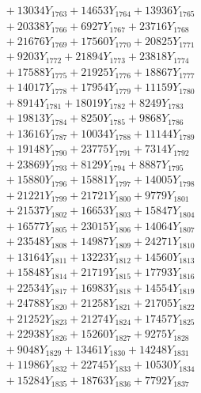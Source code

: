 \documentclass[a4paper,10pt]{article}
\begin{document}
{\begin{align}
&\;  + 13034 Y_{1763} + 14653 Y_{1764} + 13936 Y_{1765} \\[0.3ex]
&\;  + 20338 Y_{1766} + 6927 Y_{1767} + 23716 Y_{1768} \\[0.5ex]\allowbreak
&\;  + 21676 Y_{1769} + 17560 Y_{1770} + 20825 Y_{1771} \\[0.3ex]
&\;  + 9203 Y_{1772} + 21894 Y_{1773} + 23818 Y_{1774} \\[0.3ex]
&\;  + 17588 Y_{1775} + 21925 Y_{1776} + 18867 Y_{1777} \\[0.3ex]
&\;  + 14017 Y_{1778} + 17954 Y_{1779} + 11159 Y_{1780} \\[0.3ex]
&\;  + 8914 Y_{1781} + 18019 Y_{1782} + 8249 Y_{1783} \\[0.3ex]
&\;  + 19813 Y_{1784} + 8250 Y_{1785} + 9868 Y_{1786} \\[0.3ex]
&\;  + 13616 Y_{1787} + 10034 Y_{1788} + 11144 Y_{1789} \\[0.3ex]
&\;  + 19148 Y_{1790} + 23775 Y_{1791} + 7314 Y_{1792} \\[0.3ex]
&\;  + 23869 Y_{1793} + 8129 Y_{1794} + 8887 Y_{1795} \\[0.3ex]
&\;  + 15880 Y_{1796} + 15881 Y_{1797} + 14005 Y_{1798} \\[0.5ex]\allowbreak
&\;  + 21221 Y_{1799} + 21721 Y_{1800} + 9779 Y_{1801} \\[0.3ex]
&\;  + 21537 Y_{1802} + 16653 Y_{1803} + 15847 Y_{1804} \\[0.3ex]
&\;  + 16577 Y_{1805} + 23015 Y_{1806} + 14064 Y_{1807} \\[0.3ex]
&\;  + 23548 Y_{1808} + 14987 Y_{1809} + 24271 Y_{1810} \\[0.3ex]
&\;  + 13164 Y_{1811} + 13223 Y_{1812} + 14560 Y_{1813} \\[0.3ex]
&\;  + 15848 Y_{1814} + 21719 Y_{1815} + 17793 Y_{1816} \\[0.3ex]
&\;  + 22534 Y_{1817} + 16983 Y_{1818} + 14554 Y_{1819} \\[0.3ex]
&\;  + 24788 Y_{1820} + 21258 Y_{1821} + 21705 Y_{1822} \\[0.3ex]
&\;  + 21252 Y_{1823} + 21274 Y_{1824} + 17457 Y_{1825} \\[0.3ex]
&\;  + 22938 Y_{1826} + 15260 Y_{1827} + 9275 Y_{1828} \\[0.5ex]\allowbreak
&\;  + 9048 Y_{1829} + 13461 Y_{1830} + 14248 Y_{1831} \\[0.3ex]
&\;  + 11986 Y_{1832} + 22745 Y_{1833} + 10530 Y_{1834} \\[0.3ex]
&\;  + 15284 Y_{1835} + 18763 Y_{1836} + 7792 Y_{1837} \\[0.3ex]

\end{align}}
\end{document}
